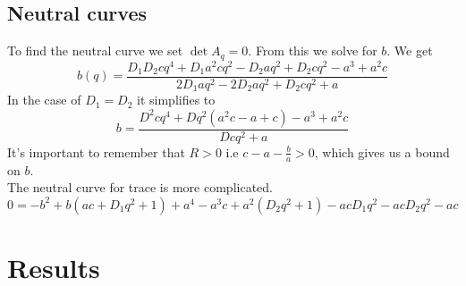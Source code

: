\documentclass{article}
\begin{document}
\subsection{Neutral curves}
To find the neutral curve we set 
$\det A_q = 0$. From this we solve for $b$. 
We get
\begin{equation}
b(q)=\frac{D_1 D_2 c q^4 + D_1 a^2 c q^2 - D_2 a q^2 + D_2 c q^2 - a^3 + a^2 c}{2 D_1 a q^2 - 2 D_2 a q^2 + D_2 c q^2 + a}
\end{equation}
In the case of $D_1=D_2$ it simplifies to
\begin{equation}
b=\frac{D^2 c q^4 +Dq^2(  a^2 c  -  a  +  c ) - a^3 + a^2 c}{D c q^2 + a} 
\end{equation}
It's important to remember that $R>0$ i.e $c-a-\frac{b}{a}>0$, which gives us a bound on $b$.\\
The neutral curve  for trace is more complicated. 
\begin{equation}
0=-b^2 + b \left(a c+D_1 q^2+1\right)+a^4-a^3 c+a^2 \left(D_2 q^2+1\right)-a c D_1 q^2-a c D_2 q^2-a c
\end{equation}

\section{Results}
\end{document}
